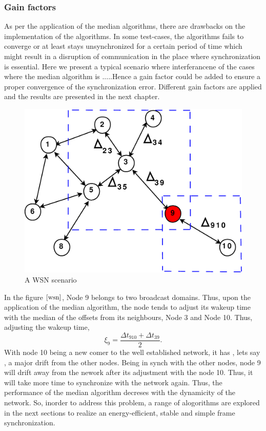 \documentclass[a4paper,8pt]{report}
\begin{document}
\subsubsection{Gain factors}
As per the application of the median algorithms, there are drawbacks
on the implementation of the algorithms. In some test-cases, the
algorithms fails to converge or at least stays unsynchronized for a
certain period of time which might result in a disruption of
communication in the place where synchronization is essential.
\newline Here we present a typical scenario where interferancene of the cases where the median algorithm is .....Hence a
gain factor could be added to ensure a proper convergence of the
synchronization error. Different gain factors are applied and the
results are presented in the next chapter.
\begin{figure}
\centering
\includegraphics[width= 0.6 \textwidth]{node_field}
\caption{A WSN scenario}
\label{wsn}
\end{figure}
In the figure $\ref{wsn}$, Node 9 belongs to two broadcast domains.
Thus, upon the application of the median algorithm, the node tends
to adjust its wakeup time with the median of the offsets from its
neighbours, Node 3 and Node 10. Thus, adjusting the wakeup time,
\begin{equation}
\xi_9 = \frac{\Delta t_{910} + \Delta t_{39}}{2}.
\end{equation}
With node 10 being a new comer to the well established network, it
has , lets say , a major drift from the other nodes. Being in synch
with the other nodes, node 9 will drift away from the nework after
its adjustment with the node 10. Thus, it will take more time to
synchronize with the network again. Thus, the performance of the
median algorithm decreses with the dynamicity of the network.\newline
So, inorder to address this problem, a range of alogorithms are explored in the next sections
to realize an energy-efficient, stable and simple frame synchronization.
\newpage
\end{document}
